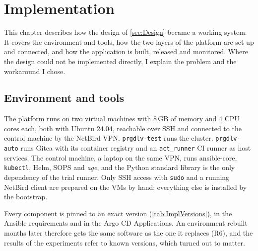\chapter{Implementation}
\label{sec:Implementation}
\providecommand{\reasontodo}[1]{\textcolor{red}{\textbf{[TODO: #1]}}}

This chapter describes how the design of \autoref{sec:Design} became a working system. It covers the environment and tools, how the two layers of the platform are set up and connected, and how the application is built, released and monitored. Where the design could not be implemented directly, I explain the problem and the workaround I chose.

\section{Environment and tools}
\label{sec:ImplEnvironment}
The platform runs on two virtual machines with 8\,GB of memory and 4 CPU cores each, both with Ubuntu 24.04, reachable over SSH and connected to the control machine by the NetBird VPN. \texttt{prgdlv-test} runs the cluster. \texttt{prgdlv-auto} runs Gitea with its container registry and an \texttt{act\_runner} CI runner as host services. The control machine, a laptop on the same VPN, runs ansible-core, \texttt{kubectl}, Helm, SOPS and \textit{age}, and the Python standard library is the only dependency of the trial runner. Only SSH access with \texttt{sudo} and a running NetBird client are prepared on the VMs by hand; everything else is installed by the bootstrap.

Every component is pinned to an exact version (\autoref{tab:ImplVersions}), in the Ansible requirements and in the Argo CD Applications. An environment rebuilt months later therefore gets the same software as the one it replaces (R6), and the results of the experiments refer to known versions, which turned out to matter.

